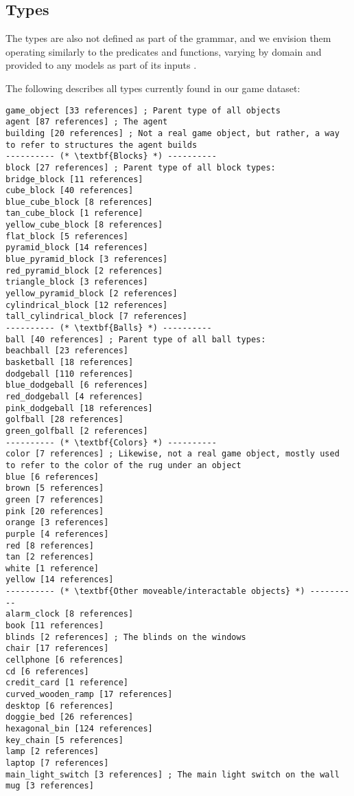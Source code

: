 \documentclass{article}
\begin{document}
\subsection{Types} \label{sec:types}
The types are also not defined as part of the grammar, and we envision them operating similarly to the predicates and functions, varying by domain and provided to any models as part of its inputs .
            
The following describes all types currently found in our game dataset: 
        
\begin{lstlisting}
game_object [33 references] ; Parent type of all objects
agent [87 references] ; The agent
building [20 references] ; Not a real game object, but rather, a way to refer to structures the agent builds
---------- (* \textbf{Blocks} *) ----------
block [27 references] ; Parent type of all block types:
bridge_block [11 references] 
cube_block [40 references] 
blue_cube_block [8 references] 
tan_cube_block [1 reference] 
yellow_cube_block [8 references] 
flat_block [5 references] 
pyramid_block [14 references] 
blue_pyramid_block [3 references] 
red_pyramid_block [2 references] 
triangle_block [3 references] 
yellow_pyramid_block [2 references] 
cylindrical_block [12 references] 
tall_cylindrical_block [7 references] 
---------- (* \textbf{Balls} *) ----------
ball [40 references] ; Parent type of all ball types:
beachball [23 references] 
basketball [18 references] 
dodgeball [110 references] 
blue_dodgeball [6 references] 
red_dodgeball [4 references] 
pink_dodgeball [18 references] 
golfball [28 references] 
green_golfball [2 references] 
---------- (* \textbf{Colors} *) ----------
color [7 references] ; Likewise, not a real game object, mostly used to refer to the color of the rug under an object
blue [6 references] 
brown [5 references] 
green [7 references] 
pink [20 references] 
orange [3 references] 
purple [4 references] 
red [8 references] 
tan [2 references] 
white [1 reference] 
yellow [14 references] 
---------- (* \textbf{Other moveable/interactable objects} *) ----------
alarm_clock [8 references] 
book [11 references] 
blinds [2 references] ; The blinds on the windows
chair [17 references] 
cellphone [6 references] 
cd [6 references] 
credit_card [1 reference] 
curved_wooden_ramp [17 references] 
desktop [6 references] 
doggie_bed [26 references] 
hexagonal_bin [124 references] 
key_chain [5 references] 
lamp [2 references] 
laptop [7 references] 
main_light_switch [3 references] ; The main light switch on the wall
mug [3 references] 

\end{lstlisting}
\end{document}
